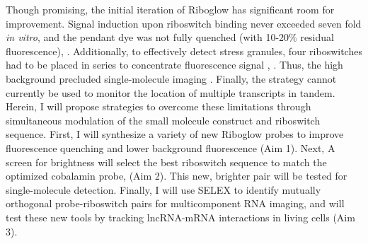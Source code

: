 Though promising, the initial iteration of Riboglow has significant room for improvement. Signal induction upon riboswitch binding never exceeded seven fold \textit{in vitro}, and the pendant dye was not fully quenched (with 10-20\% residual fluorescence),  \cite{Braselmannmulticolorriboswitchbasedplatform2018}. Additionally, to effectively detect stress granules, four riboswitches had to be placed in series to concentrate fluorescence signal \cite{Braselmannmulticolorriboswitchbasedplatform2018}, . Thus, the high background precluded single-molecule imaging . Finally, the strategy cannot currently be used to monitor the location of multiple transcripts in tandem. Herein, I will propose strategies to overcome these limitations through simultaneous modulation of the small molecule construct and riboswitch sequence.  First, I will synthesize a variety of new Riboglow probes to improve fluorescence quenching and lower background fluorescence (Aim 1). Next, A screen for brightness will select the best riboswitch sequence to match the optimized cobalamin probe,  (Aim 2). This new, brighter pair will be tested for single-molecule detection. Finally, I will use SELEX to identify mutually orthogonal probe-riboswitch pairs for multicomponent RNA imaging, and will test these new tools by tracking lncRNA-mRNA interactions in living cells (Aim 3).

